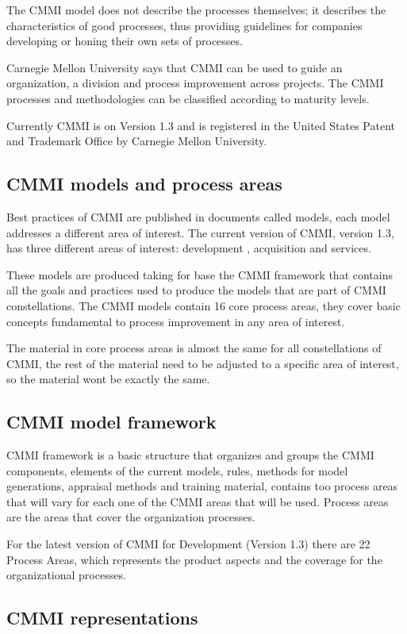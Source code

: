 The CMMI model does not describe the processes themselves; it describes the characteristics of good processes, thus providing guidelines for companies developing or honing their own sets of processes.

Carnegie Mellon University says that CMMI can be used to guide an organization, a division and process improvement across projects. The CMMI processes and methodologies can be classified according to maturity levels.

Currently CMMI is on Version 1.3 and is registered in the United States Patent and Trademark Office by Carnegie Mellon University.

\subsection{CMMI models and process areas}
Best practices of CMMI are published in documents called models, each model addresses a different area of interest. The current version of CMMI, version 1.3, has three different areas of interest: development \citep{Chrissis2006}, acquisition and services.

These models are produced taking for base the CMMI framework that contains all the goals and practices used to produce the models that are part of CMMI constellations. The CMMI models contain 16 core process areas, they cover basic concepts fundamental to process improvement in any area of interest. 

The material in core process areas is almost the same for all constellations of CMMI, the rest of the material need to be adjusted to a specific area of interest, so the material wont be exactly the same.

\subsection{CMMI model framework}
CMMI framework is a basic structure that organizes and groups the CMMI components, elements of the current models, rules, methods for model generations, appraisal methods and training material, contains too process areas that will vary for each one of the CMMI areas that will be used. Process areas are the areas that cover the organization processes.

For the latest version of CMMI for Development (Version 1.3) there are 22 Process Areas, which represents the product aspects and the coverage for the organizational processes.


\subsection{CMMI representations}

